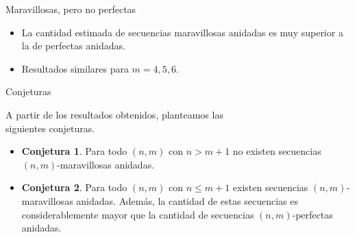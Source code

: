\documentclass[spanish,xcolor={table}]{beamer}
\begin{document}
\begin{frame}{Maravillosas, pero no perfectas}

  
  \vspace{-.5em}

  \begin{itemize}
    \item La cantidad estimada de secuencias maravillosas anidadas es muy superior a la de perfectas anidadas.
    \item Resultados similares para $m = 4, 5, 6$.
  \end{itemize}
  
\end{frame}


\begin{frame}{Conjeturas}

A partir de los resultados obtenidos, planteamos las \\ siguientes conjeturas.

\begin{itemize}
	\item \textbf{Conjetura 1}. Para todo $(n,m)$ con $n > m + 1$ no existen
		secuencias $(n,m)$-maravillosas anidadas.
	\item \textbf{Conjetura 2}. Para todo $(n,m)$ con $n \leq m + 1$ existen
	secuencias $(n,m)$-maravillosas anidadas. Además, la cantidad de estas
	secuencias es considerablemente mayor que la cantidad de secuencias
	$(n,m)$-perfectas anidadas.
\end{itemize}

\end{frame}
\end{document}
